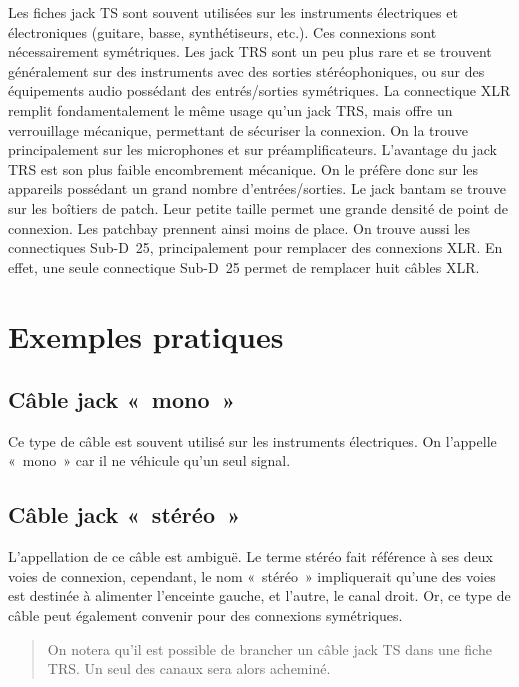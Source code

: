 \documentclass[
  letterpaper,
  DIV=11,
  numbers=noendperiod]{scrreprt}
\begin{document}
Les fiches jack TS sont souvent utilisées sur les instruments
électriques et électroniques (guitare, basse, synthétiseurs, etc.). Ces
connexions sont nécessairement symétriques. Les jack TRS sont un peu
plus rare et se trouvent généralement sur des instruments avec des
sorties stéréophoniques, ou sur des équipements audio possédant des
entrés/sorties symétriques. La connectique XLR remplit fondamentalement
le même usage qu'un jack TRS, mais offre un verrouillage mécanique,
permettant de sécuriser la connexion. On la trouve principalement sur
les microphones et sur préamplificateurs. L'avantage du jack TRS est son
plus faible encombrement mécanique. On le préfère donc sur les appareils
possédant un grand nombre d'entrées/sorties. Le jack bantam se trouve
sur les boîtiers de patch. Leur petite taille permet une grande densité
de point de connexion. Les patchbay prennent ainsi moins de place. On
trouve aussi les connectiques Sub-D~25, principalement pour remplacer
des connexions XLR. En effet, une seule connectique Sub-D~25 permet de
remplacer huit câbles XLR.

\hypertarget{exemples-pratiques}{%
\section{Exemples pratiques}\label{exemples-pratiques}}

\hypertarget{cuxe2ble-jack-mono}{%
\subsection{Câble jack «~mono~»}\label{cuxe2ble-jack-mono}}

Ce type de câble est souvent utilisé sur les instruments électriques. On
l'appelle «~mono~» car il ne véhicule qu'un seul signal.

\hypertarget{cuxe2ble-jack-stuxe9ruxe9o}{%
\subsection{Câble jack «~stéréo~»}\label{cuxe2ble-jack-stuxe9ruxe9o}}

L'appellation de ce câble est ambiguë. Le terme stéréo fait référence à
ses deux voies de connexion, cependant, le nom «~stéréo~» impliquerait
qu'une des voies est destinée à alimenter l'enceinte gauche, et l'autre,
le canal droit. Or, ce type de câble peut également convenir pour des
connexions symétriques.

\begin{quote}
On notera qu'il est possible de brancher un câble jack TS dans une fiche
TRS. Un seul des canaux sera alors acheminé.
\end{quote}
\end{document}
